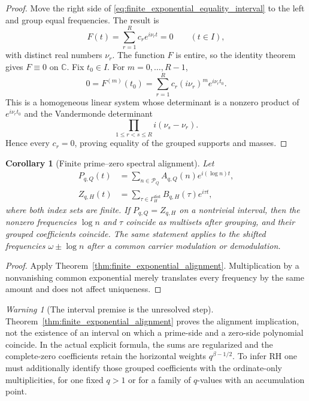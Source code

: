 \documentclass[11pt]{amsart}
\numberwithin{equation}{section}
\theoremstyle{plain}
\newtheorem{corollary}[theorem]{Corollary}
\theoremstyle{definition}
\theoremstyle{remark}
\newtheorem{warning}[theorem]{Warning}
\newcommand{\1}{\mathbf{1}}
\begin{document}
\begin{proof}
Move the right side of
\eqref{eq:finite_exponential_equality_interval} to the left and group equal
frequencies.  The result is
\begin{equation}
F(t)=\sum_{r=1}^{R}c_re^{i\nu_rt}=0
\qquad(t\in I),
\label{eq:finite_exponential_difference}
\end{equation}
with distinct real numbers \(\nu_r\).  The function \(F\) is entire, so the
identity theorem gives \(F\equiv0\) on \(\mathbb C\).  Fix
\(t_0\in I\).  For \(m=0,\ldots,R-1\),
\begin{equation}
0=F^{(m)}(t_0)
=
\sum_{r=1}^{R}c_r(i\nu_r)^me^{i\nu_rt_0}.
\label{eq:finite_exponential_derivatives}
\end{equation}
This is a homogeneous linear system whose determinant is a nonzero product
of \(e^{i\nu_rt_0}\) and the Vandermonde determinant
\begin{equation}
\prod_{1\leq r<s\leq R}i(\nu_s-\nu_r).
\label{eq:finite_exponential_vandermonde}
\end{equation}
Hence every \(c_r=0\), proving equality of the grouped supports and masses.
\end{proof}

\begin{corollary}[Finite prime--zero spectral alignment]
\label{cor:finite_prime_zero_alignment}
Let
\begin{align}
P_{q,Q}(t)
&=
\sum_{n\in\mathcal P_Q}A_{q,Q}(n)e^{i(\log n)t},
\label{eq:finite_prime_polynomial}
\\
Z_{q,H}(t)
&=
\sum_{\tau\in\Gamma_H^{\mathrm{dist}}}B_{q,H}(\tau)e^{i\tau t},
\label{eq:finite_zero_polynomial}
\end{align}
where both index sets are finite.  If \(P_{q,Q}=Z_{q,H}\) on a nontrivial
interval, then the nonzero frequencies \(\log n\) and \(\tau\) coincide as
multisets after grouping, and their grouped coefficients coincide.  The same
statement applies to the shifted frequencies \(\omega\pm\log n\) after a
common carrier modulation or demodulation.
\end{corollary}

\begin{proof}
Apply Theorem~\ref{thm:finite_exponential_alignment}.  Multiplication by a
nonvanishing common exponential merely translates every frequency by the
same amount and does not affect uniqueness.
\end{proof}

\begin{warning}[The interval premise is the unresolved step]
\label{warn:alignment_interval_premise}
Theorem~\ref{thm:finite_exponential_alignment} proves the alignment
implication, not the existence of an interval on which a prime-side and a
zero-side polynomial coincide.  In the actual explicit formula, the sums are
regularized and the complete-zero coefficients retain the horizontal weights
\(q^{\beta-1/2}\).  To infer RH one must additionally identify those grouped
coefficients with the ordinate-only multiplicities, for one fixed \(q>1\) or
for a family of \(q\)-values with an accumulation point.
\end{warning}
\end{document}
